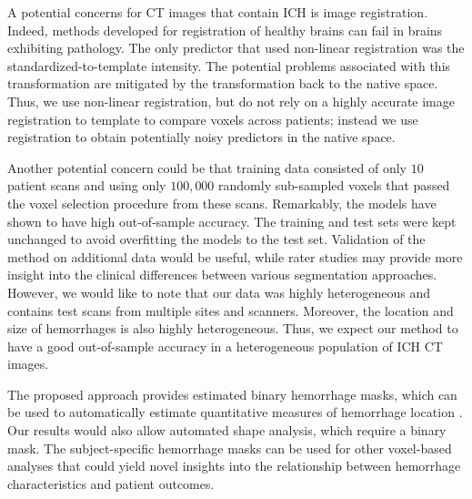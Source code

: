\documentclass{elsarticle_nonatbib}\usepackage[]{graphicx}\usepackage[]{color}
\begin{document}
A potential concerns for CT images that contain ICH is image registration.  Indeed, methods developed for registration of healthy brains can fail in brains exhibiting pathology.  The only predictor that used non-linear registration was the standardized-to-template intensity. The potential problems associated with this transformation are mitigated by the transformation back to the native space. 
Thus, we use non-linear registration, but do not rely on a highly accurate image registration to template to compare voxels across patients; instead we use registration to obtain potentially noisy predictors in the native space.

Another potential concern could be that training data consisted of only $10$ patient scans and using only $100{,}000$ randomly sub-sampled voxels that passed the voxel selection procedure from these scans.  Remarkably, the models have shown to have high out-of-sample accuracy.  The training and test sets were kept unchanged to avoid overfitting the models to the test set.  
Validation of the method on additional data would be useful, while rater studies may provide more insight into the clinical differences between various segmentation approaches.  However, we would like to note that our data was highly heterogeneous and contains test scans from multiple sites and scanners. Moreover, the location and size of hemorrhages is also highly heterogeneous.  Thus, we expect our method to have a good out-of-sample accuracy in a heterogeneous population of ICH CT images.

The proposed approach provides estimated binary hemorrhage masks, which can be used to automatically estimate quantitative measures of hemorrhage location \citep{muschelli2015quantitative}.  Our results would also allow automated shape analysis, which require a binary mask.  The subject-specific hemorrhage masks can be used for other voxel-based analyses that could yield novel insights into the relationship between hemorrhage characteristics and patient outcomes.
\end{document}
